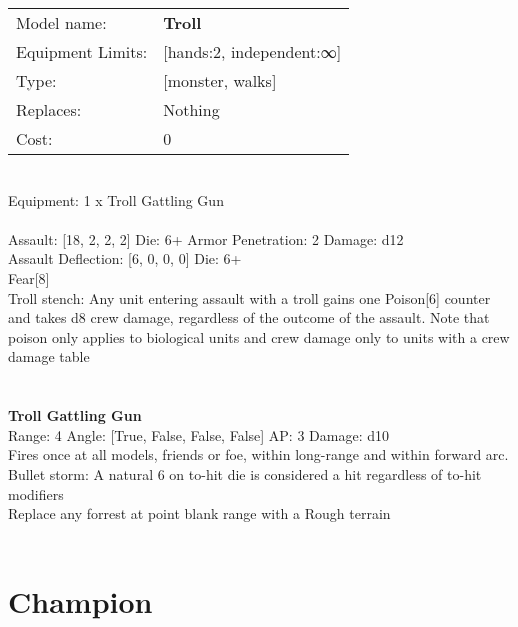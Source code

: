 \noindent
\begin{tabular}{ll}
Model name: &{\bf Troll } \\
Equipment Limits: &[hands:2, independent:∞] \\
Type: &[monster, walks] \\
Replaces: &Nothing \\
Cost: & 0\\
\end{tabular}
\ \\
Equipment: 1 x Troll Gattling Gun \\
\ \\
Assault: [18, 2, 2, 2] Die: 6+ Armor Penetration: 2 Damage: d12 \\
Assault Deflection: [6, 0, 0, 0] Die: 6+\\
\indent Fear[8]\\ 
Troll stench: Any unit entering assault with a troll gains one Poison[6] counter and takes d8 crew damage, regardless of the outcome of the assault. Note that poison only applies to biological units and crew damage only to units with a crew damage table\\ 
 
\ \\

\ \\
{\bf Troll Gattling Gun } \\



Range: 4  Angle: [True, False, False, False] AP: 3 Damage: d10 \\
Fires once at all models, friends or foe, within long-range and within forward arc.\\ 
Bullet storm: A natural 6 on to-hit die is considered a hit regardless of to-hit modifiers\\ 
Replace any forrest at point blank range with a Rough terrain\\ 




 
\ \\













\clearpage

\section{ Champion }

